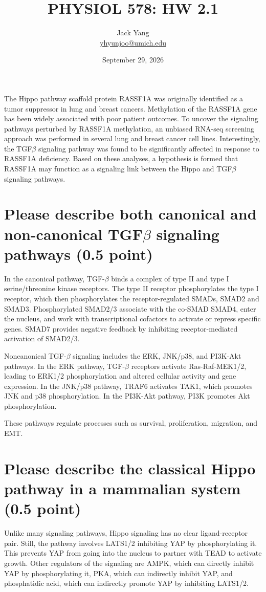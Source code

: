 \documentclass{article}
\title{PHYSIOL 578: HW 2.1\footnotetext{U-M GPT was used to refine language of answers derived independently.}}
\author{Jack Yang \\ \href{mailto:yhyunjoo@umich.edu}{yhyunjoo@umich.edu}}
\date{September 29, 2026}
\begin{document}
\maketitle

The Hippo pathway scaffold protein RASSF1A was originally identified as a tumor suppressor in lung and breast cancers. Methylation of the RASSF1A gene has been widely associated with poor patient outcomes. To uncover the signaling pathways perturbed by RASSF1A methylation, an unbiased RNA-seq screening approach was performed in several lung and breast cancer cell lines. Interestingly, the TGF$\beta$ signaling pathway was found to be significantly affected in response to RASSF1A deficiency. Based on these analyses, a hypothesis is formed that RASSF1A may function as a signaling link between the Hippo and TGF$\beta$ signaling pathways.

\section{
    Please describe both canonical and non-canonical TGF$\beta$ signaling pathways (0.5 point)
}
In the canonical pathway, TGF-$\beta$ binds a complex of type II and type I serine/threonine kinase receptors.
The type II receptor phosphorylates the type I receptor, which then phosphorylates the receptor-regulated SMADs, SMAD2 and SMAD3.
Phosphorylated SMAD2/3 associate with the co-SMAD SMAD4, enter the nucleus, and work with transcriptional cofactors to activate or repress specific genes.
SMAD7 provides negative feedback by inhibiting receptor-mediated activation of SMAD2/3.

Noncanonical TGF-$\beta$ signaling includes the ERK, JNK/p38, and PI3K-Akt pathways.
In the ERK pathway, TGF-$\beta$ receptors activate Ras-Raf-MEK1/2, leading to ERK1/2 phosphorylation and altered cellular activity and gene expression.
In the JNK/p38 pathway, TRAF6 activates TAK1, which promotes JNK and p38 phosphorylation.
In the PI3K-Akt pathway, PI3K promotes Akt phosphorylation.

These pathways regulate processes such as survival, proliferation, migration, and EMT.

\section{
    Please describe the classical Hippo pathway in a mammalian system (0.5 point)
}
Unlike many signaling pathways, Hippo signaling has no clear ligand-receptor pair.
Still, the pathway involves LATS1/2 inhibiting YAP by phosphorylating it.
This prevents YAP from going into the nucleus to partner with TEAD to activate growth.
Other regulators of the signaling are AMPK, which can directly inhibit YAP by phosphorylating it,
PKA, which can indirectly inhibit YAP, and phosphatidic acid, which can indirectly promote YAP by inhibiting LATS1/2.
\end{document}
